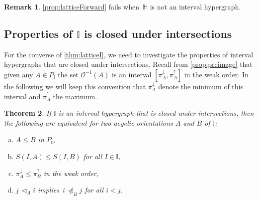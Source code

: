 \documentclass[reqno]{amsart}
\newtheorem{theorem}{Theorem}[section]
\theoremstyle{definition}
\newtheorem{remark}[theorem]{Remark}
\newcommand{\vincent}[1]{\todo[color=blue!30]{#1 \\ \hfill --- V.}}
\newcommand{\less}{\vartriangleleft} %
\newcommand{\projDown}{\pi^\downarrow} %
\newcommand{\projUp}{\pi^\uparrow} %
\newcommand{\Or}{\mathcal O}  %
\newcommand{\HH}{\mathbb H}  %
\newcommand{\II}{\mathbb I} %
\begin{document}
\begin{remark}
\cref{prop:latticeForward} fails when~$\HH$ is not an interval hypergraph.
\vincent{todo}
\end{remark}


\subsection{Properties of $\II$ is closed under intersections}  
\label{subsec:IntClosedI}

For the converse of \cref{thm:latticeI}, we need to investigate the properties of interval hypergraphs that are closed under intersections.
Recall from \cref{prop:preimage} that given any $A\in P_\II$ the set $\Or^{-1}(A)$ is an interval $[\projDown_A,\projUp_A]$ in the weak order.
In the following we will keep this convention that $\projDown_A$ denote the minimum of this interval and $\projUp_A$ the maximum.

\begin{theorem}
\label{thm:propertieofintI}
If $\II$ is an interval  hypergraph that is closed under intersections, then the following are equivalent for two acyclic orientations $A$ and $B$ of $\II$:
\begin{enumerate}[(a)]
	\item $A\le B$ in $P_\II$,
	\item $S(I,A)\le S(I,B)$ for all $I\in\II$,
	\item $\projDown_A \le \projUp_B$ in the weak order,
	\item $j\,\less_A i$ implies~$i \,\not\less_B j$ for all $i<j$.
\end{enumerate}
\end{theorem}
\end{document}
